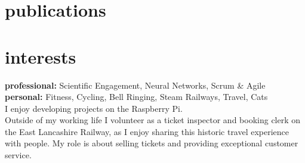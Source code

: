 \documentclass[]{cv-style}          %
\begin{document}

\section{publications}
\begin{entrylist}
\end{entrylist}

\section{interests}
  \vspace{-0.2cm}

\textbf{professional:} Scientific Engagement, Neural Networks, Scrum \& Agile\\

\textbf{personal:} Fitness, Cycling, Bell Ringing, Steam Railways, Travel, Cats\\
I enjoy developing projects on the Raspberry Pi.\\
Outside of my working life I volunteer as a ticket inspector and booking clerk on the East Lancashire Railway, as I enjoy sharing this historic travel experience with people. My role is about selling tickets and providing exceptional customer service.

\end{document}
